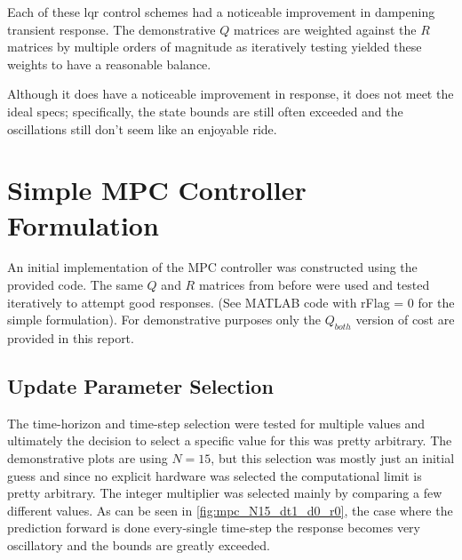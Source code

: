 \documentclass[onecolumn]{IEEEtran}
\begin{document}
Each of these lqr control schemes had a noticeable improvement in dampening transient response.
The demonstrative $Q$ matrices are weighted against the $R$ matrices by multiple orders of magnitude as iteratively testing yielded these weights to have a reasonable balance.

Although it does have a noticeable improvement in response, it does not meet the ideal specs; specifically, the state bounds are still often exceeded and the oscillations still don't seem like an enjoyable ride.

\newpage \clearpage \clearpage
\section{Simple MPC Controller Formulation}
An initial implementation of the MPC controller was constructed using the provided code.
The same $Q$ and $R$ matrices from before were used and tested iteratively to attempt good responses.
(See MATLAB code with rFlag = 0 for the simple formulation).
For demonstrative purposes only the $Q_{both}$ version of cost are provided in this report.

\subsection{Update Parameter Selection}
The time-horizon and time-step selection were tested for multiple values and ultimately the decision to select a specific value for this was pretty arbitrary.
The demonstrative plots are using $N=15$, but this selection was mostly just an initial guess and since no explicit hardware was selected the computational limit is pretty arbitrary.
The integer multiplier was selected mainly by comparing a few different values.
As can be seen in \autoref{fig:mpc_N15_dt1_d0_r0}, the case where the prediction forward is done every-single time-step the response becomes very oscillatory and the bounds are greatly exceeded.
\end{document}

